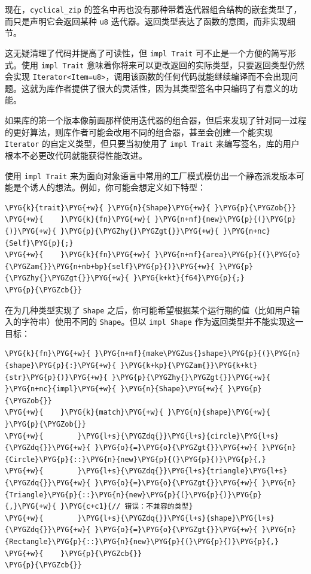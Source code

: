 现在，\texttt{cyclical\_zip} 的签名中再也没有那种带着迭代器组合结构的嵌套类型了，而只是声明它会返回某种 \texttt{u8} 迭代器。返回类型表达了函数的意图，而非实现细节。

这无疑清理了代码并提高了可读性，但 \texttt{impl Trait} 可不止是一个方便的简写形式。使用 \texttt{impl Trait} 意味着你将来可以更改返回的实际类型，只要返回类型仍然会实现 \texttt{Iterator<Item=u8>}，调用该函数的任何代码就能继续编译而不会出现问题。这就为库作者提供了很大的灵活性，因为其类型签名中只编码了有意义的功能。

如果库的第一个版本像前面那样使用迭代器的组合器，但后来发现了针对同一过程的更好算法，则库作者可能会改用不同的组合器，甚至会创建一个能实现 \texttt{Iterator} 的自定义类型，但只要当初使用了 \texttt{impl Trait} 来编写签名，库的用户根本不必更改代码就能获得性能改进。

使用 \texttt{impl Trait} 来为面向对象语言中常用的工厂模式模仿出一个静态派发版本可能是个诱人的想法。例如，你可能会想定义如下特型：

\begin{Verbatim}[commandchars=\\\{\},breaklines=true,breakanywhere=true,fontsize=\codefont,xleftmargin=17bp]
\PYG{k}{trait}\PYG{+w}{ }\PYG{n}{Shape}\PYG{+w}{ }\PYG{p}{\PYGZob{}}
\PYG{+w}{    }\PYG{k}{fn}\PYG{+w}{ }\PYG{n+nf}{new}\PYG{p}{(}\PYG{p}{)}\PYG{+w}{ }\PYG{p}{\PYGZhy{}\PYGZgt{}}\PYG{+w}{ }\PYG{n+nc}{Self}\PYG{p}{;}
\PYG{+w}{    }\PYG{k}{fn}\PYG{+w}{ }\PYG{n+nf}{area}\PYG{p}{(}\PYG{o}{\PYGZam{}}\PYG{n+nb+bp}{self}\PYG{p}{)}\PYG{+w}{ }\PYG{p}{\PYGZhy{}\PYGZgt{}}\PYG{+w}{ }\PYG{k+kt}{f64}\PYG{p}{;}
\PYG{p}{\PYGZcb{}}
\end{Verbatim}

在为几种类型实现了 \texttt{Shape} 之后，你可能希望根据某个运行期的值（比如用户输入的字符串）使用不同的 \texttt{Shape}。但以 \texttt{impl Shape} 作为返回类型并不能实现这一目标：

\begin{Verbatim}[commandchars=\\\{\},breaklines=true,breakanywhere=true,fontsize=\codefont,xleftmargin=17bp]
\PYG{k}{fn}\PYG{+w}{ }\PYG{n+nf}{make\PYGZus{}shape}\PYG{p}{(}\PYG{n}{shape}\PYG{p}{:}\PYG{+w}{ }\PYG{k+kp}{\PYGZam{}}\PYG{k+kt}{str}\PYG{p}{)}\PYG{+w}{ }\PYG{p}{\PYGZhy{}\PYGZgt{}}\PYG{+w}{ }\PYG{n+nc}{impl}\PYG{+w}{ }\PYG{n}{Shape}\PYG{+w}{ }\PYG{p}{\PYGZob{}}
\PYG{+w}{    }\PYG{k}{match}\PYG{+w}{ }\PYG{n}{shape}\PYG{+w}{ }\PYG{p}{\PYGZob{}}
\PYG{+w}{        }\PYG{l+s}{\PYGZdq{}}\PYG{l+s}{circle}\PYG{l+s}{\PYGZdq{}}\PYG{+w}{ }\PYG{o}{=}\PYG{o}{\PYGZgt{}}\PYG{+w}{ }\PYG{n}{Circle}\PYG{p}{::}\PYG{n}{new}\PYG{p}{(}\PYG{p}{)}\PYG{p}{,}
\PYG{+w}{        }\PYG{l+s}{\PYGZdq{}}\PYG{l+s}{triangle}\PYG{l+s}{\PYGZdq{}}\PYG{+w}{ }\PYG{o}{=}\PYG{o}{\PYGZgt{}}\PYG{+w}{ }\PYG{n}{Triangle}\PYG{p}{::}\PYG{n}{new}\PYG{p}{(}\PYG{p}{)}\PYG{p}{,}\PYG{+w}{ }\PYG{c+c1}{// 错误：不兼容的类型}
\PYG{+w}{        }\PYG{l+s}{\PYGZdq{}}\PYG{l+s}{shape}\PYG{l+s}{\PYGZdq{}}\PYG{+w}{ }\PYG{o}{=}\PYG{o}{\PYGZgt{}}\PYG{+w}{ }\PYG{n}{Rectangle}\PYG{p}{::}\PYG{n}{new}\PYG{p}{(}\PYG{p}{)}\PYG{p}{,}
\PYG{+w}{    }\PYG{p}{\PYGZcb{}}
\PYG{p}{\PYGZcb{}}
\end{Verbatim}

